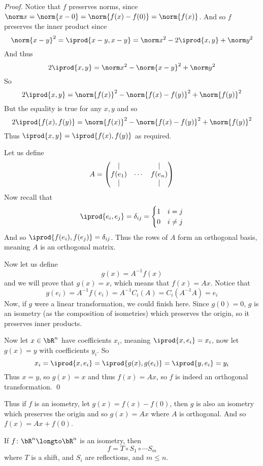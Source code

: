\begin{proof}

    Notice that $f$ preserves norms, since $\norm x=\norm{x-0}=\norm{f(x)-f(0)}=\norm{f(x)}$.
    And so $f$ preserves the inner product since
    \[ \norm{x-y}^2 = \iprod{x-y,x-y} = \norm x^2-2\iprod{x,y}+\norm y^2 \]
    And thus
    \[ 2\iprod{x,y} = \norm x^2-\norm{x-y}^2+\norm y^2 \]
    So
    \[ 2\iprod{x,y} = \norm{f(x)}^2-\norm{f(x)-f(y)}^2+\norm{f(y)}^2 \]
    But the equality is true for any $x,y$ and so
    \[ 2\iprod{f(x),f(y)} = \norm{f(x)}^2-\norm{f(x)-f(y)}^2+\norm{f(y)}^2 \]
    Thus $\iprod{x,y}=\iprod{f(x),f(y)}$ as required.

    Let us define
    \[ A = \begin{pmatrix}\vert & & \vert \\ f(e_1) & \cdots & f(e_n) \\ \vert & & \vert\end{pmatrix} \]
    Now recall that
    \[ \iprod{e_i,e_j} = \delta_{ij} = \begin{cases} 1 & i=j \\ 0 & i\neq j \end{cases} \]
    And so $\iprod{f(e_i),f(e_j)}=\delta_{ij}$.
    Thus the rows of $A$ form an orthogonal basis, meaning $A$ is an orthogonal matrix.

    Now let us define
    \[ g(x) = A^{-1}f(x) \]
    and we will prove that $g(x)=x$, which means that $f(x)=Ax$.
    Notice that
    \[ g(e_i) = A^{-1}f(e_i) = A^{-1}C_i(A) = C_i(A^{-1}A) = e_i \]
    Now, if $g$ were a linear transformation, we could finish here.
    Since $g(0)=0$, $g$ is an isometry (as the composition of isometries) which preserves the origin, so it preserves inner products.

    Now let $x\in\bR^n$ have coefficients $x_i$, meaning $\iprod{x,e_i}=x_i$, now let $g(x)=y$ with coefficients $y_i$.
    So
    \[ x_i = \iprod{x,e_i} = \iprod{g(x),g(e_i)} = \iprod{y,e_i} = y_i \]
    Thus $x=y$, so $g(x)=x$ and thus $f(x)=Ax$, so $f$ is indeed an orthogonal transformation.
    \qed

\end{proof}

Thus if $f$ is an isometry, let $g(x)=f(x)-f(0)$, then $g$ is also an isometry which preserves the origin and so $g(x)=Ax$ where $A$ is orthogonal.
And so $f(x)=Ax+f(0)$.

\begin{thrm*}

    If $f\colon\bR^n\longto\bR^n$ is an isometry, then
    \[ f = T\circ S_1\circ\cdots S_m \]
    where $T$ is a shift, and $S_i$ are reflections, and $m\leq n$.

\end{thrm*}

